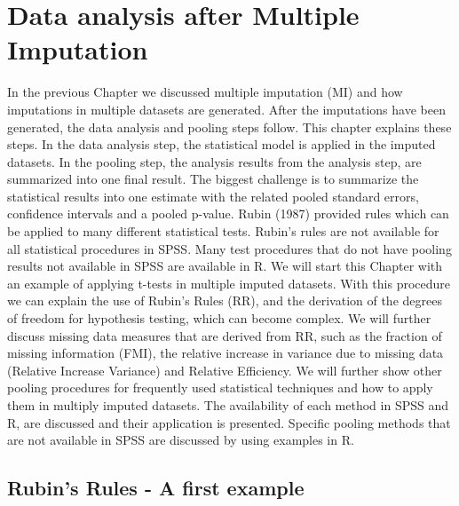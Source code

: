 \documentclass[]{book}
\theoremstyle{definition}
\theoremstyle{definition}
\theoremstyle{definition}
\theoremstyle{remark}
\begin{document}
\chapter{Data analysis after Multiple
Imputation}\label{data-analysis-after-multiple-imputation}

In the previous Chapter we discussed multiple imputation (MI) and how
imputations in multiple datasets are generated. After the imputations
have been generated, the data analysis and pooling steps follow. This
chapter explains these steps. In the data analysis step, the statistical
model is applied in the imputed datasets. In the pooling step, the
analysis results from the analysis step, are summarized into one final
result. The biggest challenge is to summarize the statistical results
into one estimate with the related pooled standard errors, confidence
intervals and a pooled p-value. Rubin (1987) provided rules which can be
applied to many different statistical tests. Rubin's rules are not
available for all statistical procedures in SPSS. Many test procedures
that do not have pooling results not available in SPSS are available in
R. We will start this Chapter with an example of applying t-tests in
multiple imputed datasets. With this procedure we can explain the use of
Rubin's Rules (RR), and the derivation of the degrees of freedom for
hypothesis testing, which can become complex. We will further discuss
missing data measures that are derived from RR, such as the fraction of
missing information (FMI), the relative increase in variance due to
missing data (Relative Increase Variance) and Relative Efficiency. We
will further show other pooling procedures for frequently used
statistical techniques and how to apply them in multiply imputed
datasets. The availability of each method in SPSS and R, are discussed
and their application is presented. Specific pooling methods that are
not available in SPSS are discussed by using examples in R.

\section{Rubin's Rules - A first
example}\label{rubins-rules---a-first-example}
\end{document}
